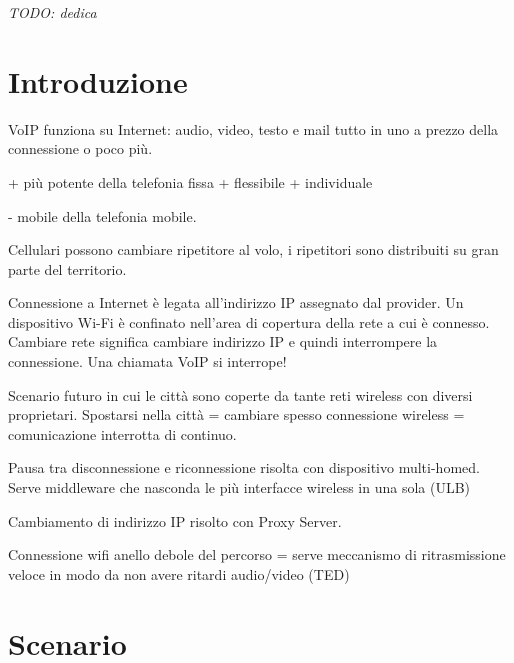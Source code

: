 \documentclass[12pt,a4paper,openright,twoside]{book}
\begin{document}
%
%
\begin{titlepage}
	\thispagestyle{empty}
	\topmargin=6.5cm
	\raggedleft
	\large
	\em
	TODO: dedica
\end{titlepage}


\chapter*{Introduzione}

	VoIP funziona su Internet: audio, video, testo e mail tutto in uno a prezzo
	della connessione o poco più.

	+ più potente della telefonia fissa
	+ flessibile
	+ individuale

	- mobile della telefonia mobile.

	Cellulari possono cambiare ripetitore al volo, i ripetitori sono distribuiti
	su gran parte del territorio.

	Connessione a Internet è legata all'indirizzo IP assegnato dal provider.
	Un dispositivo Wi-Fi è confinato nell'area di copertura della rete a cui è
	connesso. Cambiare rete significa cambiare indirizzo IP e quindi
	interrompere la connessione. Una chiamata VoIP si interrope!

	Scenario futuro in cui le città sono coperte da tante reti wireless con
	diversi proprietari. Spostarsi nella città = cambiare spesso connessione
	wireless = comunicazione interrotta di continuo.

	Pausa tra disconnessione e riconnessione risolta con dispositivo
	multi-homed. Serve middleware che nasconda le più interfacce wireless in una
	sola (ULB)

	Cambiamento di indirizzo IP risolto con Proxy Server.

	Connessione wifi anello debole del percorso = serve meccanismo di
	ritrasmissione veloce in modo da non avere ritardi audio/video (TED)

\tableofcontents
\rhead[\fancyplain{}{\bfseries\leftmark}]{\fancyplain{}{\bfseries\thepage}}

\chapter{Scenario}
\lhead[\fancyplain{}{\bfseries\thepage}]{\fancyplain{}{\bfseries\rightmark}}
\end{document}
